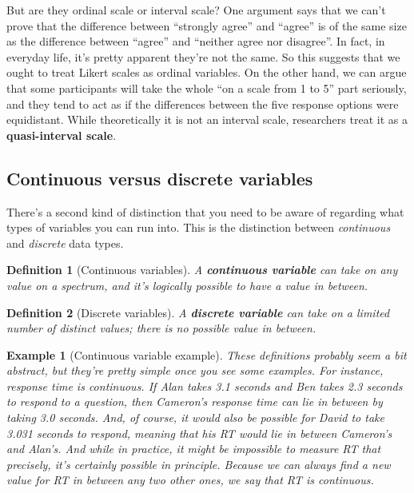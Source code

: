 \documentclass[
  11pt,
]{book}
\theoremstyle{indenteddefinition}
\newtheorem{definition}{Definition}[chapter]
\theoremstyle{indenteddefinition}
\newtheorem{example}{Example}[chapter]
\theoremstyle{definition}
\theoremstyle{definition}
\theoremstyle{remark}
\begin{document}
But are they ordinal scale or interval scale? One argument says that we can't prove that the difference between ``strongly agree'' and ``agree'' is of the same size as the difference between ``agree'' and ``neither agree nor disagree''. In fact, in everyday life, it's pretty apparent they're not the same. So this suggests that we ought to treat Likert scales as ordinal variables. On the other hand, we can argue that some participants will take the whole ``on a scale from 1 to 5'' part seriously, and they tend to act as if the differences between the five response options were equidistant. While theoretically it is not an interval scale, researchers treat it as a \textbf{quasi-interval scale}.

\hypertarget{continuousdiscrete}{%
\subsection{Continuous versus discrete variables}\label{continuousdiscrete}}

There's a second kind of distinction that you need to be aware of regarding what types of variables you can run into. This is the distinction between \emph{continuous} and \emph{discrete} data types.

\begin{definition}[Continuous variables]
\protect\hypertarget{def:defcontinuous}{}\label{def:defcontinuous}A \textbf{continuous variable} can take on any value on a spectrum, and it's logically possible to have a value in between.
\end{definition}

\begin{definition}[Discrete variables]
\protect\hypertarget{def:defdiscrete}{}\label{def:defdiscrete}A \textbf{discrete variable} can take on a limited number of distinct values; there is no possible value in between.
\end{definition}

\begin{example}[Continuous variable example]
\protect\hypertarget{exm:excontinuous}{}\label{exm:excontinuous}These definitions probably seem a bit abstract, but they're pretty simple once you see some examples. For instance, response time is continuous. If Alan takes 3.1 seconds and Ben takes 2.3 seconds to respond to a question, then Cameron's response time can lie in between by taking 3.0 seconds. And, of course, it would also be possible for David to take 3.031 seconds to respond, meaning that his RT would lie in between Cameron's and Alan's. And while in practice, it might be impossible to measure RT that precisely, it's certainly possible in principle. Because we can always find a new value for RT in between any two other ones, we say that RT is continuous.
\end{example}
\end{document}
